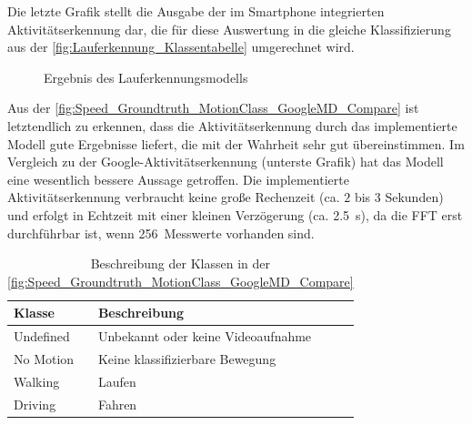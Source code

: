 Die letzte Grafik stellt die Ausgabe der im Smartphone integrierten Aktivitäts\-erkenn\-ung dar, die für diese Auswertung in die gleiche Klassifizierung aus der \autoref{fig:Lauferkennung_Klassentabelle} umgerechnet wird.
	\begin{figure}[htpb]
		\centering
		\caption{Ergebnis des Lauferkennungsmodells}
		\label{fig:Speed_Groundtruth_MotionClass_GoogleMD_Compare}
	\end{figure}


Aus der \autoref{fig:Speed_Groundtruth_MotionClass_GoogleMD_Compare} ist letztendlich zu erkennen, dass die Aktivitäts\-erkenn\-ung durch das implementierte Modell gute Ergebnisse liefert, die mit der Wahrheit sehr gut übereinstimmen. Im Vergleich zu der Google-Aktivitäts\-erkenn\-ung (unterste Grafik) hat das Modell eine wesentlich bessere Aussage getroffen. Die implementierte Aktivitätserkennung verbraucht keine große Rechenzeit (ca. $2$ bis $3$ Sekunden) und erfolgt in Echtzeit mit einer kleinen Verzögerung (ca. \SI{2,5}{\second}), da die FFT erst durchführbar ist, wenn \SI{256}{Messwerte} vorhanden sind.

\begin{table}[htpb]
	\caption{Beschreibung der Klassen in der \autoref{fig:Speed_Groundtruth_MotionClass_GoogleMD_Compare}}
	\label{fig:Lauferkennung_Klassentabelle}
	\centering
	\begin{tabular}{|l|l|}
		\hline
		\textbf{Klasse} & \textbf{Beschreibung}\\
		\hline
		Undefined & Unbekannt oder keine Videoaufnahme\\ 
		\hline
		No Motion &  Keine klassifizierbare Bewegung\\ 
		\hline
		Walking & Laufen\\ 
		\hline
		Driving & Fahren\\ 
		\hline
	\end{tabular}
\end{table}

